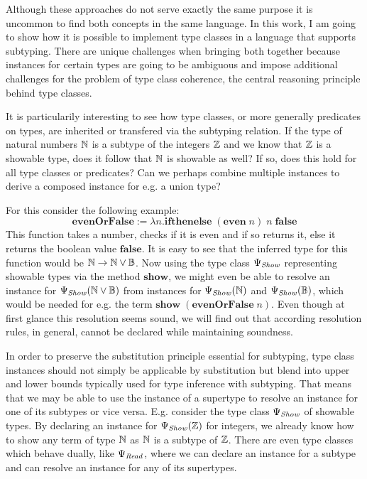 Although these approaches do not serve exactly the same purpose it is uncommon to find both concepts in the same language.
In this work, I am going to show how it is possible to implement type classes in a language that supports subtyping.
There are unique challenges when bringing both together because instances for certain types are going to be ambiguous and impose additional challenges for the problem of type class coherence, the central reasoning principle behind type classes.

It is particularily interesting to see how type classes, or more generally predicates on types, are inherited or transfered via the subtyping relation.
If the type of natural numbers $\mathbb{N}$ is a subtype of the integers $\mathbb{Z}$ and we know that $\mathbb{Z}$ is a showable type, does it follow that $\mathbb{N}$ is showable as well?
If so, does this hold for all type classes or predicates?
Can we perhaps combine multiple instances to derive a composed instance for e.g. a union type?

For this consider the following example:
$$
\mathbf{evenOrFalse} := \lambda n. \mathbf{ifthenelse} \; (\mathbf{even} \; n) \; n \; \mathbf{false}
$$
This function takes a number, checks if it is even and if so returns it, else it returns the boolean value $\mathbf{false}$.
It is easy to see that the inferred type for this function would be $\mathbb{N} \to \mathbb{N} \vee \mathbb{B}$.
Now using the type class $\Psi_\mathit{Show}$ representing showable types via the method $\mathbf{show}$, we might even be able to resolve an instance for $\Psi_\mathit{Show}(\mathbb{N} \vee \mathbb{B})$ from instances
for $\Psi_\mathit{Show}(\mathbb{N})$ and $\Psi_\mathit{Show}(\mathbb{B})$, which would be needed for e.g. the term $\mathbf{show} \; (\mathbf{evenOrFalse} \; n)$.
Even though at first glance this resolution seems sound, we will find out that according resolution rules, in general, cannot be declared while maintaining soundness.

In order to preserve the substitution principle essential for subtyping, type class instances should not simply be applicable by substitution but blend into upper and lower bounds typically used for type inference with subtyping.
That means that we may be able to use the instance of a supertype to resolve an instance for one of its subtypes or vice versa.
E.g. consider the type class $\Psi_\mathit{Show}$ of showable types.
By declaring an instance for $\Psi_\mathit{Show}(\mathbb{Z})$ for integers, we already know how to show any term of type $\mathbb{N}$ as $\mathbb{N}$ is a subtype of $\mathbb{Z}$.
There are even type classes which behave dually, like $\Psi_\mathit{Read}$, where we can declare an instance for a subtype and can resolve an instance for any of its supertypes.

